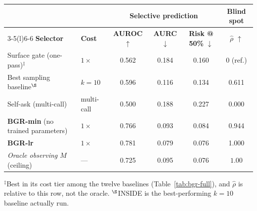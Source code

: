 \documentclass{article}
\begin{document}
\begin{center}
\small
{}
\label{tab:bgr}
\vspace{1pt}
\begin{tabular}{@{}llcccc@{}}
\toprule
& & \multicolumn{3}{c}{\textbf{Selective prediction}} & \textbf{Blind spot}\\
\cmidrule(lr){3-5}\cmidrule(l){6-6}
\textbf{Selector} & \textbf{Cost} & \textbf{AUROC} $\uparrow$ & \textbf{AURC} $\downarrow$ &
\textbf{Risk @ 50\%} $\downarrow$ & $\hat\rho$ $\uparrow$\\
\midrule
Surface gate (one-pass)$^{\ddagger}$ & $1\times$   & 0.562 & 0.184 & 0.160 & 0 (ref.)\\
Best sampling baseline$^{\S}$  & $k{=}10$    & 0.596 & 0.116 & 0.134 & 0.611\\
Self-ask (multi-call)         & multi-call  & 0.500 & 0.188 & 0.227 & 0.000\\
\midrule
\textbf{BGR-min} (no trained parameters) & $1\times$ & 0.766 & 0.093 & 0.084 & 0.944\\
\textbf{BGR-lr}                          & $1\times$ & 0.781 & 0.079 & 0.076 & 1.000\\
\midrule
\textit{Oracle observing $M$} \textnormal{(ceiling)} & --- & 0.725 & 0.095 & 0.076 & $1.00$\\
\bottomrule
\end{tabular}

\vspace{2pt}
{\footnotesize $^{\ddagger}$Best in its cost tier among the twelve baselines (Table~\ref{tab:bgr-full}),
and $\hat\rho$ is relative to this row, not the oracle.\quad
$^{\S}$INSIDE \citep{chen2024inside} is the best-performing $k{=}10$ baseline actually
run.}
\vspace{-0.5em}
\end{center}
\end{document}
